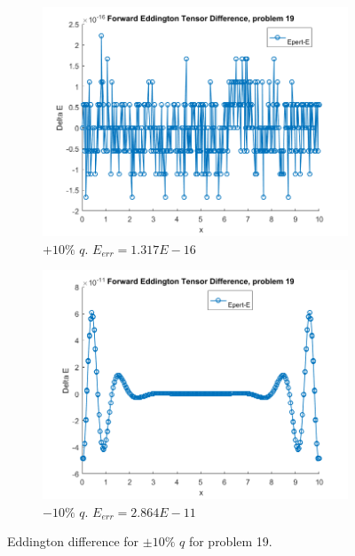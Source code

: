 \documentclass{article}
\begin{document}
\begin{figure}[H]
\centering
\begin{subfigure}{.5\textwidth}
  \centering
  \includegraphics[width=1\linewidth]{p19deltaEdq.png}
  \caption{$+10\%$ $q$. $E_{err}=1.317E-16$}
  \label{fig:sub1}
\end{subfigure}%
\begin{subfigure}{.5\textwidth}
  \centering
  \includegraphics[width=1\linewidth]{p19deltaEdq-10.png}
  \caption{$-10\%$ $q$. $E_{err}=2.864E-11$}
  \label{fig:sub2}
\end{subfigure}
\caption{Eddington difference for $\pm10\%$ $q$ for problem 19.}
\label{fig:test}
\end{figure}
\end{document}
